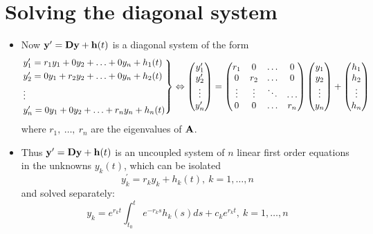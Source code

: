 \documentclass[11pt,a4paper]{article}
\begin{document}
	\section*{Solving the diagonal system}
	\begin{itemize}
		\item Now $\vb{y}^\prime = \vb{Dy} + \vb{h}(t)$ is a diagonal system of the form
		$$
		\begin{rcases}
			y_1^\prime = r_1y_1 + 0y_2 + \ldots + 0y_n + h_1(t)\\
			y_2^\prime = 0y_1 + r_2y_2 + \ldots + 0y_n + h_2(t)\\
			\vdots\\
			y_n^\prime = 0y_1 + 0y_2 + \ldots + r_ny_n + h_n(t)
		\end{rcases} \Leftrightarrow
		\begin{pmatrix}
			y_1^\prime\\
			y_2^\prime\\
			\vdots\\
			y_n^\prime		
		\end{pmatrix}=
		\begin{pmatrix}
			r_1 & 0 & \ldots & 0\\
			0 & r_2 & \ldots & 0\\
			\vdots & \vdots & \ddots & \ldots\\
			0 & 0 & \ldots & r_n
		\end{pmatrix}
		\begin{pmatrix}
			y_1\\
			y_2\\
			\vdots\\
			y_n
		\end{pmatrix} +
		\begin{pmatrix}
			h_1\\
			h_2\\
			\vdots\\
			h_n
		\end{pmatrix}
		$$
		where $r_1,\ \ldots,\ r_n$ are the eigenvalues of $\vb{A}$.
		\item Thus $\vb{y}^\prime = \vb{Dy} + \vb{h}(t)$ is an uncoupled system of $n$ linear first order equations in the unknowns $y_k(t)$, which can be isolated
		$$
		y_k^\prime = r_ky_k + h_k(t),\ k=1,\ldots,n
		$$
		and solved separately:
		$$
		y_k = e^{r_kt}\int_{t_0}^t\ e^{-r_ks}h_k(s)ds + c_ke^{r_kt},\ k=1,\ldots,n
		$$
	\end{itemize}
\end{document}
